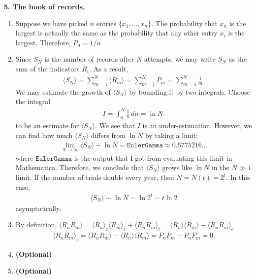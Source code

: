 \documentclass{article}
\theoremstyle{definition}
\newcommand{\f}[2]{\frac{#1}{#2}}
\begin{document}
\noindent \textbf{5. The book of records.} 

\begin{enumerate}[label=(\alph*)]
	\item Suppose we have picked $n$ entries $\{x_1,\dots,x_n\}$. The probability that $x_n$ is the largest is actually the same as the probability that any other entry $x_i$ is the largest. Therefore, $\boxed{P_n = 1/n}$
	
	\item Since $S_N$ is the number of records after $N$ attempts, we may write $S_N$ as the sum of the indicators $R_i$. As a result,
	\begin{align*}
	\langle S_N \rangle = \sum^N_{m=1} \langle R_m \rangle = \sum^N_{m=1} P_m = \sum^N_{m=1}\f{1}{m}.
	\end{align*}
	We may estimate the growth of $\langle S_N \rangle$ by bounding it by two integrals. Choose the integral 
	\begin{align*}
	I = \int_0^N \f{1}{n}\,dn = \ln N.
	\end{align*}
	to be an estimate for $\langle S_N \rangle$. We see that $I$ is an under-estimation. However, we can find how much $\langle S_N \rangle$ differs from $\ln N$ by taking a limit:
	\begin{align*}
	\lim_{N\to \infty} \langle S_N \rangle - \ln N = \texttt{EulerGamma} \approx 0.5775216\dots
	\end{align*}
	where $\texttt{EulerGamma}$ is the output that I got from evaluating this limit in Mathematica. Therefore, we conclude that $\langle S_N \rangle$ grows like $\boxed{\ln N}$ in the $N\gg 1$ limit. If the number of trials double every year, then $N = N(t) = 2^t$. In this case,
	\begin{align*}
	\langle S_N \rangle \sim \ln N = \ln 2^t = \boxed{t\ln 2}
	\end{align*}
	asymptotically. 
	
	
	
	\item  By definition, $\langle R_n R_m \rangle = \langle R_n \rangle_c \langle R_m \rangle_c + \langle R_n R_m \rangle_c = \langle R_n \rangle \langle R_m \rangle + \langle R_n R_m \rangle_c$
	\begin{align*}
	\langle R_n R_m \rangle_c = \langle R_n R_m \rangle - \langle R_n \rangle \langle R_m \rangle = P_nP_m - P_nP_m = 0.
	\end{align*}
	
	
	
	\item \textbf{(Optional)}
	
	
	\item \textbf{(Optional)}
\end{enumerate}
\end{document}
